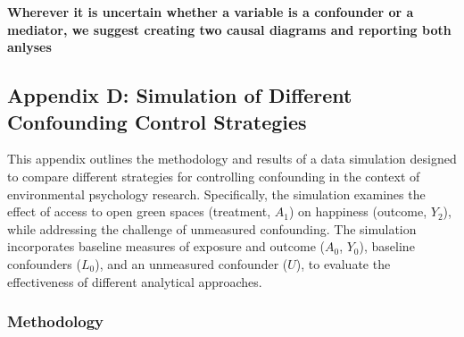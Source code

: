 \documentclass[
  singlecolumn]{article}
\begin{document}
\textbf{Wherever it is uncertain whether a variable is a confounder or a
mediator, we suggest creating two causal diagrams and reporting both
anlyses}

\newpage{}

\subsection{Appendix D: Simulation of Different Confounding Control
Strategies}\label{appendix-d}

This appendix outlines the methodology and results of a data simulation
designed to compare different strategies for controlling confounding in
the context of environmental psychology research. Specifically, the
simulation examines the effect of access to open green spaces
(treatment, \(A_1\)) on happiness (outcome, \(Y_2\)), while addressing
the challenge of unmeasured confounding. The simulation incorporates
baseline measures of exposure and outcome (\(A_0\), \(Y_0\)), baseline
confounders (\(L_0\)), and an unmeasured confounder (\(U\)), to evaluate
the effectiveness of different analytical approaches.

\subsubsection{Methodology}\label{methodology}
\end{document}
